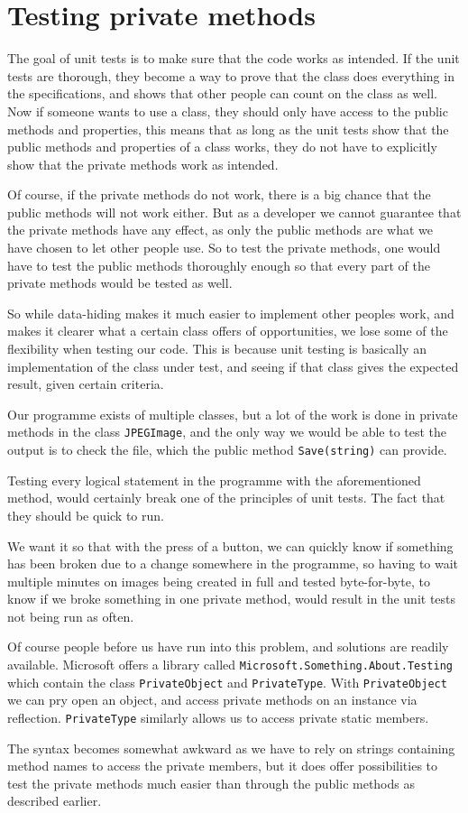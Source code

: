 \section{Testing private methods}
The goal of unit tests is to make sure that the code works as intended.
If the unit tests are thorough, they become a way to prove that the class does everything in the specifications, and shows that other people can count on the class as well.
Now if someone wants to use a class, they should only have access to the public methods and properties, this means that as long as the unit tests show that the public methods and properties of a class works, they do not have to explicitly show that the private methods work as intended.

Of course, if the private methods do not work, there is a big chance that the public methods will not work either.
But as a developer we cannot guarantee that the private methods have any effect, as only the public methods are what we have chosen to let other people use. 
So to test the private methods, one would have to test the public methods thoroughly enough so that every part of the private methods would be tested as well. 

So while data-hiding makes it much easier to implement other peoples work, and makes it clearer what a certain class offers of opportunities, we lose some of the flexibility when testing our code. This is because unit testing is basically an implementation of the class under test, and seeing if that class gives the expected result, given certain criteria. 

Our programme exists of multiple classes, but a lot of the work is done in private methods in the class \lstinline|JPEGImage|, and the only way we would be able to test the output is to check the file, which the public method \lstinline|Save(string)| can provide.

Testing every logical statement in the programme with the aforementioned method, would certainly break one of the principles of unit tests. The fact that they should be quick to run.

We want it so that with the press of a button, we can quickly know if something has been broken due to a change somewhere in the programme, so having to wait multiple minutes on images being created in full and tested byte-for-byte, to know if we broke something in one private method, would result in the unit tests not being run as often. 

Of course people before us have run into this problem, and solutions are readily available.
Microsoft offers a library called \lstinline|Microsoft.Something.About.Testing| which contain the class \lstinline|PrivateObject| and \lstinline|PrivateType|.
With \lstinline|PrivateObject| we can pry open an object, and access private methods on an instance via reflection. \lstinline|PrivateType| similarly allows us to access private static members. 

The syntax becomes somewhat awkward as we have to rely on strings containing method names to access the private members, but it does offer possibilities to test the private methods much easier than through the public methods as described earlier.